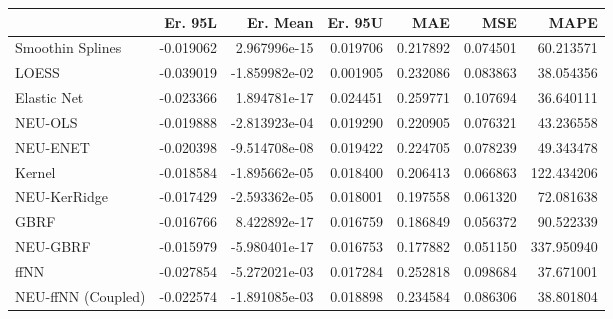 \begin{tabular}{lrrrrrr}
\toprule
{} &   Er. 95L &      Er. Mean &   Er. 95U &       MAE &       MSE &        MAPE \\
\midrule
Smoothin Splines   & -0.019062 &  2.967996e-15 &  0.019706 &  0.217892 &  0.074501 &   60.213571 \\
LOESS              & -0.039019 & -1.859982e-02 &  0.001905 &  0.232086 &  0.083863 &   38.054356 \\
Elastic Net        & -0.023366 &  1.894781e-17 &  0.024451 &  0.259771 &  0.107694 &   36.640111 \\
NEU-OLS            & -0.019888 & -2.813923e-04 &  0.019290 &  0.220905 &  0.076321 &   43.236558 \\
NEU-ENET           & -0.020398 & -9.514708e-08 &  0.019422 &  0.224705 &  0.078239 &   49.343478 \\
Kernel             & -0.018584 & -1.895662e-05 &  0.018400 &  0.206413 &  0.066863 &  122.434206 \\
NEU-KerRidge       & -0.017429 & -2.593362e-05 &  0.018001 &  0.197558 &  0.061320 &   72.081638 \\
GBRF               & -0.016766 &  8.422892e-17 &  0.016759 &  0.186849 &  0.056372 &   90.522339 \\
NEU-GBRF           & -0.015979 & -5.980401e-17 &  0.016753 &  0.177882 &  0.051150 &  337.950940 \\
ffNN               & -0.027854 & -5.272021e-03 &  0.017284 &  0.252818 &  0.098684 &   37.671001 \\
NEU-ffNN (Coupled) & -0.022574 & -1.891085e-03 &  0.018898 &  0.234584 &  0.086306 &   38.801804 \\
\bottomrule
\end{tabular}
